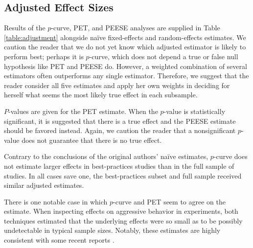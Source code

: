\documentclass[man]{apa6}
\begin{document}
\subsection{Adjusted Effect Sizes}
Results of the $p$-curve, PET, and PEESE analyses are supplied in Table \ref{table:adjustment} alongside na{\"i}ve fixed-effects and random-effects estimates. We caution the reader that we do not yet know which adjusted estimator is likely to perform best; perhaps it is $p$-curve, which does not depend a true or false null hypothesis like PET and PEESE do. However, a weighted combination of several estimators often outperforms any single estimator. Therefore, we suggest that the reader consider all five estimates and apply her own weights in deciding for herself what seems the most likely true effect in each subsample. 

$P$-values are given for the PET estimate. When the $p$-value is statistically significant, it is suggested that there is a true effect and the PEESE estimate should be favored instead. Again, we caution the reader that a nonsignificant $p$-value does not guarantee that there is no true effect.  

Contrary to the conclusions of the original authors' na{\"i}ve estimates, $p$-curve does not estimate larger effects in best-practices studies than in the full sample of studies. In all cases save one, the best-practices subset and full sample received similar adjusted estimates. 


There is one notable case in which $p$-curve and PET seem to agree on the estimate. When inspecting effects on aggressive behavior in experiments, both techniques estimated that the underlying effects were so small as to be possibly undetectable in typical sample sizes. Notably, these estimates are highly consistent with some recent reports \citep{Engelhardt:etal:2015,Hilgard:2015,Kneer:etal:inpress,Tear:Nielsen:2014,Przybylski:etal:2014}.
\end{document}
